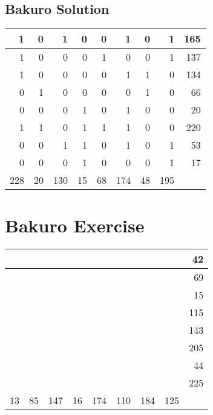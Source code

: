 \documentclass[]{article}
\begin{document}
 \subsection{Bakuro Solution} 
\begin{tabular}{rrrrrrrrr}
\hline
   1 &  0 &   1 &  0 &  0 &   1 &  0 &   1 & 165 \\ \hline
   1 &  0 &   0 &  0 &  1 &   0 &  0 &   1 & 137 \\ \hline
   1 &  0 &   0 &  0 &  0 &   1 &  1 &   0 & 134 \\ \hline
   0 &  1 &   0 &  0 &  0 &   0 &  1 &   0 &  66 \\ \hline
   0 &  0 &   0 &  1 &  0 &   1 &  0 &   0 &  20 \\ \hline
   1 &  1 &   0 &  1 &  1 &   1 &  0 &   0 & 220 \\ \hline
   0 &  0 &   1 &  1 &  0 &   1 &  0 &   1 &  53 \\ \hline
   0 &  0 &   0 &  1 &  0 &   0 &  0 &   1 &  17 \\ \hline
 228 & 20 & 130 & 15 & 68 & 174 & 48 & 195 &     \\ \hline
\hline
\end{tabular}\newpage\section{Bakuro Exercise}\begin{tabular}{rrrrrrrrr}
\hline
    &    &     &    &     &     &     &     &  42 \\ \hline
    &    &     &    &     &     &     &     &  69 \\ \hline
    &    &     &    &     &     &     &     &  15 \\ \hline
    &    &     &    &     &     &     &     & 115 \\ \hline
    &    &     &    &     &     &     &     & 143 \\ \hline
    &    &     &    &     &     &     &     & 205 \\ \hline
    &    &     &    &     &     &     &     &  44 \\ \hline
    &    &     &    &     &     &     &     & 225 \\ \hline
 13 & 85 & 147 & 16 & 174 & 110 & 184 & 125 &     \\ \hline
\hline
\end{tabular}\newpage 
\end{document}
